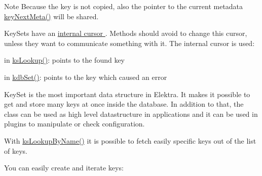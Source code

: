 \begin{DoxyNote}{Note}
Because the key is not copied, also the pointer to the current metadata \hyperlink{group__keymeta_ga4c88342f580a4291455a801af71ce048}{key\+Next\+Meta()} will be shared.
\end{DoxyNote}
Key\+Sets have an \hyperlink{group__keyset_ga4287b9416912c5f2ab9c195cb74fb094}{internal cursor }. Methods should avoid to change this cursor, unless they want to communicate something with it. The internal cursor is used\+:


\begin{DoxyItemize}
\item in \hyperlink{group__keyset_ga60f1ddcf23272f2b29b90e92ebe9b56f}{ks\+Lookup()}\+: points to the found key
\item in \hyperlink{group__kdb_ga11436b058408f83d303ca5e996832bcf}{kdb\+Set()}\+: points to the key which caused an error
\end{DoxyItemize}

Key\+Set is the most important data structure in Elektra. It makes it possible to get and store many keys at once inside the database. In addition to that, the class can be used as high level datastructure in applications and it can be used in plugins to manipulate or check configuration.

With \hyperlink{group__keyset_gad65d2cdcbb5381194a1688e169af8a83}{ks\+Lookup\+By\+Name()} it is possible to fetch easily specific keys out of the list of keys.

You can easily create and iterate keys\+:




